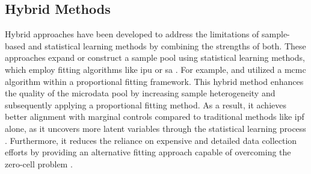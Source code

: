﻿\documentclass[../main.tex]{subfiles}
\begin{document}


\subsection{Hybrid Methods}

Hybrid approaches have been developed to address the limitations of sample-based and statistical learning methods by combining the strengths of both. These approaches expand or construct a sample pool using statistical learning methods, which employ fitting algorithms like \gls{ipu} or \gls{sa} \citep{Sun2015ASynthesis, Tozluoglu2023APatterns}. For example, \citet{Fournier2021IntegratedMethod} and \citet{Casati2015SyntheticRaking} utilized a \gls{mcmc} algorithm within a proportional fitting framework. This hybrid method enhances the quality of the microdata pool by increasing sample heterogeneity and subsequently applying a proportional fitting method. As a result, it achieves better alignment with marginal controls compared to traditional methods like \gls{ipf} alone, as it uncovers more latent variables through the statistical learning process \citep{Muller2017ASYNTHESIS}. Furthermore, it reduces the reliance on expensive and detailed data collection efforts by providing an alternative fitting approach capable of overcoming the zero-cell problem \citep{Zhou2022CreatingMicrosimulation}.
\end{document}
